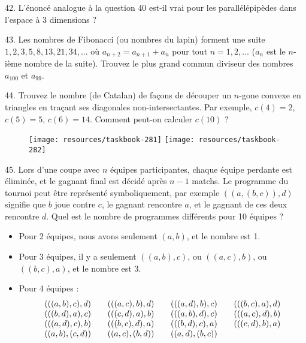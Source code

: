 \begin{problem}{42.}
	L’énoncé analogue à la question 40 est-il vrai pour les parallélépipèdes
	dans l’espace à 3 dimensions ?
\end{problem}

\begin{problem}{43.}
	Les nombres de Fibonacci (ou nombres du lapin) forment une suite $1, 2, 3,
	5, 8, 13, 21, 34, \dotsc$ où $a_{n+2}=a_{n+1}+a_n$ pour tout $n=1, 2,
	\dotsc$ ($a_n$ est le $n$-ième nombre de la suite). Trouvez le plus grand
	commun diviseur des nombres $a_{100}$ et $a_{99}$.
\end{problem}

\begin{problem}{44.}
	Trouvez le nombre (de Catalan) de façons de découper un $n$-gone convexe en
	triangles en traçant ses diagonales non-intersectantes. Par exemple,
	$c(4)=2$, $c(5)=5$, $c(6)=14$. Comment peut-on calculer $c(10)$ ?
	\begin{figure}
		\texttt{[image: resources/taskbook-281]}
		\qquad
		\texttt{[image: resources/taskbook-282]}
	\end{figure}
\end{problem}

\begin{problem}{45.}
	Lors d'une coupe avec $n$ équipes participantes, chaque équipe perdante est
	éliminée, et le gagnant final est décidé après $n-1$ matchs. Le programme du
	tournoi peut être représenté symboliquement, par exemple $((a,(b,c)),d)$
	signifie que $b$ joue contre $c$, le gagnant rencontre $a$, et le gagnant de
	ces deux rencontre $d$. Quel est le nombre de programmes différents pour 10
	équipes ?
	\begin{itemize}
		\item Pour 2 équipes, nous avons seulement $(a,b)$, et le nombre est 1.
		\item Pour 3 équipes, il y a seulement $((a,b),c)$, ou $((a,c),b)$, ou
		$((b,c),a)$, et le nombre est 3.
		\item Pour 4 équipes :
			\begin{equation*}
				\begin{array}{@{}cccc@{}}
					(((a,b),c),d) & \quad\;(((a,c),b),d) & \quad\;(((a,d),b),c) & \quad\;(((b,c),a),d) \\
					(((b,d),a),c) & \quad\;(((c,d),a),b) & \quad\;(((a,b),d),c) & \quad\;(((a,c),d),b) \\
					(((a,d),c),b) & \quad\;(((b,c),d),a) & \quad\;(((b,d),c),a) & \quad\;(((c,d),b),a) \\
					((a,b),(c,d)) & \quad\;((a,c),(b,d)) & \quad\;((a,d),(b,c))
				\end{array}
			\end{equation*}
	\end{itemize}
\end{problem}


